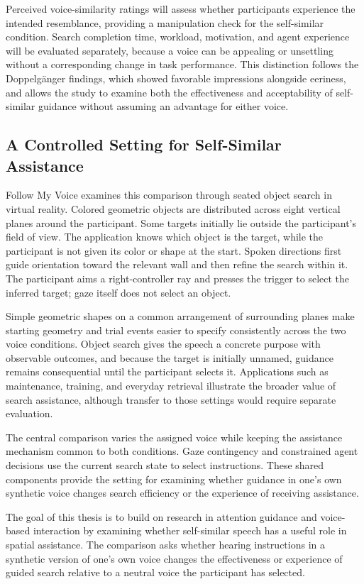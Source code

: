 Perceived voice-similarity ratings will assess whether participants experience the intended resemblance, providing a manipulation check for the self-similar condition. Search completion time, workload, motivation, and agent experience will be evaluated separately, because a voice can be appealing or unsettling without a corresponding change in task performance. This distinction follows the Doppelg\"anger findings, which showed favorable impressions alongside eeriness, and allows the study to examine both the effectiveness and acceptability of self-similar guidance without assuming an advantage for either voice.

\subsection{A Controlled Setting for Self-Similar Assistance}
Follow My Voice examines this comparison through seated object search in virtual reality. Colored geometric objects are distributed across eight vertical planes around the participant. Some targets initially lie outside the participant's field of view. The application knows which object is the target, while the participant is not given its color or shape at the start. Spoken directions first guide orientation toward the relevant wall and then refine the search within it. The participant aims a right-controller ray and presses the trigger to select the inferred target; gaze itself does not select an object.

Simple geometric shapes on a common arrangement of surrounding planes make starting geometry and trial events easier to specify consistently across the two voice conditions. Object search gives the speech a concrete purpose with observable outcomes, and because the target is initially unnamed, guidance remains consequential until the participant selects it. Applications such as maintenance, training, and everyday retrieval illustrate the broader value of search assistance, although transfer to those settings would require separate evaluation.

The central comparison varies the assigned voice while keeping the assistance mechanism common to both conditions. Gaze contingency and constrained agent decisions use the current search state to select instructions. These shared components provide the setting for examining whether guidance in one's own synthetic voice changes search efficiency or the experience of receiving assistance.

The goal of this thesis is to build on research in attention guidance and voice-based interaction by examining whether self-similar speech has a useful role in spatial assistance. The comparison asks whether hearing instructions in a synthetic version of one's own voice changes the effectiveness or experience of guided search relative to a neutral voice the participant has selected.

